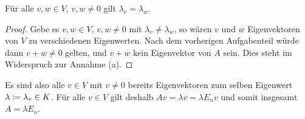 \begin{claim*}
  Für alle $v, w \in V$, $v, w \neq 0$ gilt $\lambda_v = \lambda_w$.
\end{claim*}

\begin{proof}
  Gebe es $v, w \in V$, $v, w \neq 0$ mit $\lambda_v \neq \lambda_w$, so wären $v$ und $w$ Eigenvektoren von $V$ zu verschiedenen Eigenwerten.
  Nach dem vorherigen Aufgabenteil würde dann $v + w \neq 0$ gelten, und $v + w$ kein Eigenvektor von $A$ sein.
  Dies steht im Widerspruch zur Annahme (a).
\end{proof}

Es sind also alle $v \in V$ mit $v \neq 0$ bereits Eigenvektoren zum selben Eigenwert $\lambda \coloneqq \lambda_v \in K$.
Für alle $v \in V$ gilt deshalb $Av = \lambda v = \lambda E_n v$ und somit insgesamt $A = \lambda E_n$.





